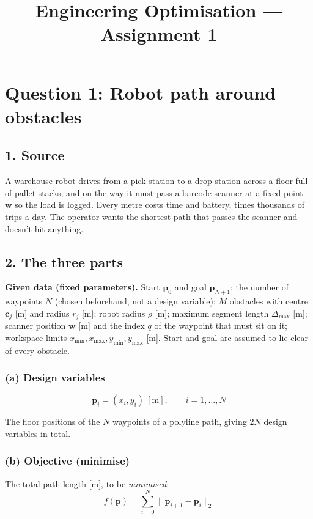 \documentclass[11pt,a4paper]{article}
\title{Engineering Optimisation --- Assignment 1}
\author{}
\date{}
\begin{document}
\maketitle

\section*{Question 1: Robot path around obstacles}

\subsection*{1. Source}

A warehouse robot drives from a pick station to a drop station across a floor
full of pallet stacks, and on the way it must pass a barcode scanner at a fixed
point $\bm{w}$ so the load is logged. Every metre costs time and battery, times
thousands of trips a day. The operator wants the shortest path that passes the
scanner and doesn't hit anything.

\subsection*{2. The three parts}

\textbf{Given data (fixed parameters).} Start $\bm{p}_0$ and goal
$\bm{p}_{N+1}$; the number of waypoints $N$ (chosen beforehand, not a design
variable); $M$ obstacles with centre $\bm{c}_j$ [m] and radius $r_j$ [m]; robot
radius $\rho$ [m]; maximum segment length $\Delta_{\max}$ [m]; scanner position
$\bm{w}$ [m] and the index $q$ of the waypoint that must sit on it; workspace
limits $x_{\min}, x_{\max}, y_{\min}, y_{\max}$ [m]. Start and goal are assumed
to lie clear of every obstacle.

\subsubsection*{(a) Design variables}

\[
  \bm{p}_i = (x_i, y_i) \ [\mathrm{m}], \qquad i = 1,\dots,N
\]

The floor positions of the $N$ waypoints of a polyline path, giving $2N$
design variables in total.

\subsubsection*{(b) Objective (minimise)}

The total path length [m], to be \emph{minimised}:
\[
  f(\bm{p}) = \sum_{i=0}^{N} \lVert \bm{p}_{i+1} - \bm{p}_i \rVert_2
\]
\end{document}
